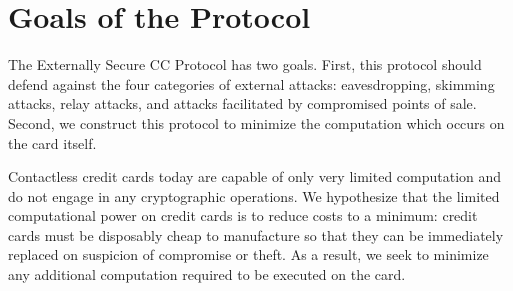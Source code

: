 \section{Goals of the Protocol}
\label{sec:external-goals}

The Externally Secure CC Protocol has two goals.
First, this protocol should defend against the four categories of external attacks:
    eavesdropping, skimming attacks, relay attacks, and attacks facilitated by compromised points of sale.
Second, we construct this protocol to minimize the computation which occurs on the card itself.

Contactless credit cards today are capable of only very limited computation and do not engage in any cryptographic operations.
We hypothesize that the limited computational power on credit cards is to reduce costs to a minimum:
    credit cards must be disposably cheap to manufacture so that they can be immediately replaced on suspicion of compromise or theft.
As a result, we seek to minimize any additional computation required to be executed on the card.